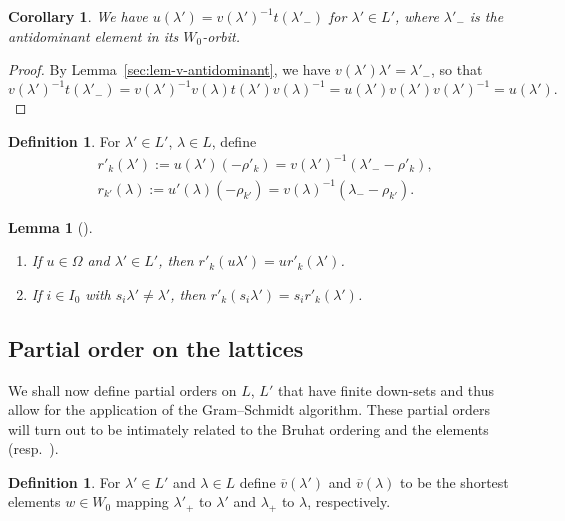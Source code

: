 \documentclass[10pt,a4paper]{amsart}
\newtheorem{Lemma}[Theorem]{Lemma}
\newtheorem{Corollary}[Theorem]{Corollary}
\theoremstyle{definition}
\newtheorem{Definition}[Theorem]{Definition}
\numberwithin{equation}{section}
\begin{document}
\begin{Corollary}
 We have $u(\lambda')=v(\lambda')^{-1}t(\lambda'_-)$ for $\lambda'\in L'$, where
 $\lambda'_-$ is the antidominant element in its $W_0$-orbit.
\end{Corollary}
\begin{proof}
 By Lemma~\ref{sec:lem-v-antidominant}, we have $v(\lambda')\lambda'=\lambda'_-$,
 so that
 \[
 v(\lambda')^{-1}t(\lambda'_-) = v(\lambda')^{-1}v(\lambda)t(\lambda')v(\lambda)^{-1}
 = u(\lambda')v(\lambda')v(\lambda')^{-1}
 = u(\lambda').\tag*{\qed}
 \]\renewcommand{\qed}{}
\end{proof}

\begin{Definition}
 For $\lambda'\in L'$, $\lambda\in L$, define
 \begin{align*}
& r'_k(\lambda'):= u(\lambda')(-\rho'_k)= v(\lambda')^{-1}(\lambda'_--\rho'_k),\\
& r_{k'}(\lambda):= u'(\lambda)(-\rho_{k'}) = v(\lambda)^{-1}(\lambda_--\rho_{k'}).
 \end{align*}
\end{Definition}

\begin{Lemma}[{\cite[Section~2.8.4]{macdonald}}] \label{sec:lem-pull-out-of-r}\leavevmode
\begin{enumerate}\itemsep=0pt
\item[$(i)$] If $u\in\Omega$ and $\lambda'\in L'$, then $r'_k(u\lambda')=ur'_k(\lambda')$.
\item[$(ii)$] If $i\in I_0$ with $s_i\lambda'\ne\lambda'$, then $r'_k(s_i\lambda')=s_ir'_k(\lambda')$.
\end{enumerate}
\end{Lemma}

\subsection{Partial order on the lattices}\label{sec:partial-order}
We shall now define partial orders on $L$, $L'$ that have finite
down-sets and thus allow for the application of the Gram--Schmidt algorithm.
These
partial orders will turn out to be intimately related to the Bruhat
ordering and the elements  (resp.\
).

\begin{Definition}
 For $\lambda'\in L'$ and $\lambda\in L$ define $\overline{v}(\lambda')$ and
 $\overline{v}(\lambda)$ to be the shortest elements $w\in W_0$ mapping
 $\lambda'_+$ to $\lambda'$ and $\lambda_+$ to $\lambda$, respectively.
\end{Definition}
\end{document}
